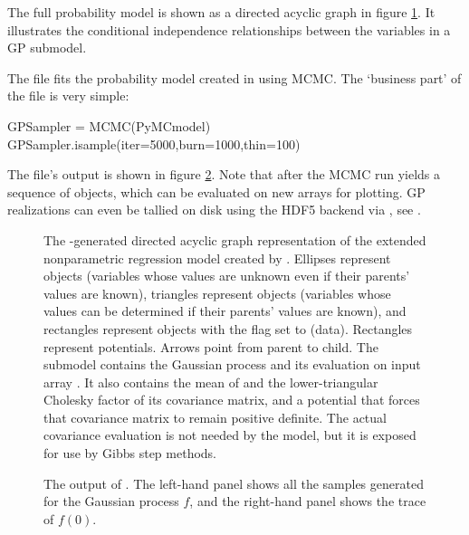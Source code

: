The full probability model is shown as a directed acyclic graph in figure \ref{fig:unobservedModel}. It illustrates the conditional independence relationships between the variables in a GP submodel.

The file  fits the probability model created in  using MCMC. The `business part' of the file is very simple:
\begin{CodeChunk}
\begin{CodeInput}
GPSampler = MCMC(PyMCmodel)
GPSampler.isample(iter=5000,burn=1000,thin=100)    
\end{CodeInput}
\end{CodeChunk}
The file's output is shown in figure \ref{fig:MCMCOutput}. Note that after the MCMC run  yields a sequence of  objects, which can be evaluated on new arrays for plotting. GP realizations can even be tallied on disk using the HDF5 backend via  \citep{tables}, see \cite{pymc}.

\begin{figure}
    \centering
    \caption{The -generated directed acyclic graph representation of the extended nonparametric regression model created by . Ellipses represent  objects (variables whose values are unknown even if their parents' values are known), triangles represent  objects (variables whose values can be determined if their parents' values are known), and rectangles represent  objects with the  flag set to  (data). Rectangles represent potentials. Arrows point from parent to child. The submodel contains the Gaussian process  and its evaluation  on input array . It also contains the mean  of  and the lower-triangular Cholesky factor  of its covariance matrix, and a potential  that forces that covariance matrix to remain positive definite. The actual covariance evaluation  is not needed by the model, but it is exposed for use by Gibbs step methods.}
    \label{fig:unobservedModel}
\end{figure}

\begin{figure}
    \centering
    \caption{The output of . The left-hand panel shows all the samples generated for the Gaussian process $f$, and the right-hand panel shows the trace of $f(0)$.}
    \label{fig:MCMCOutput}
\end{figure}






